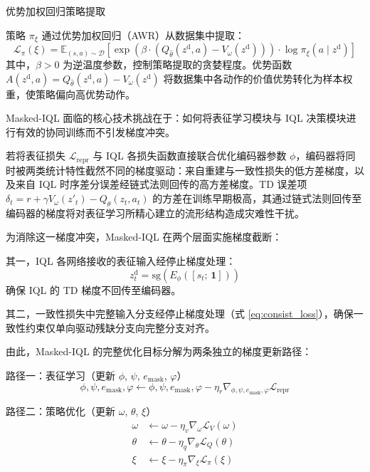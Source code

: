 优势加权回归策略提取

策略 $\pi_\xi$ 通过优势加权回归（AWR）从数据集中提取：
\begin{equation}
    \mathcal{L}_\pi(\xi) = \mathbb{E}_{(s, a) \sim \mathcal{D}}\!\left[\exp\!\left(\beta \cdot (Q_{\hat{\theta}}(z^{\text{d}}, a) - V_\omega(z^{\text{d}}))\right) \cdot \log \pi_\xi(a \mid z^{\text{d}})\right]
    \label{eq:iql_policy}
\end{equation}
其中，$\beta > 0$ 为逆温度参数，控制策略提取的贪婪程度。优势函数 $A(z^{\text{d}},a) = Q_{\hat{\theta}}(z^{\text{d}},a) - V_\omega(z^{\text{d}})$ 将数据集中各动作的价值优势转化为样本权重，使策略偏向高优势动作。

\label{sec:gradient_decouple}

Masked-IQL 面临的核心技术挑战在于：如何将表征学习模块与 IQL 决策模块进行有效的协同训练而不引发梯度冲突。

若将表征损失 $\mathcal{L}_{\text{repr}}$ 与 IQL 各损失函数直接联合优化编码器参数 $\phi$，编码器将同时被两类统计特性截然不同的梯度驱动：来自重建与一致性损失的低方差梯度，以及来自 IQL 时序差分误差经链式法则回传的高方差梯度。TD 误差项 $\delta_t = r + \gamma V_\omega(z'_t) - Q_\theta(z_t, a_t)$ 的方差在训练早期极高，其通过链式法则回传至编码器的梯度将对表征学习所精心建立的流形结构造成灾难性干扰。

为消除这一梯度冲突，Masked-IQL 在两个层面实施梯度截断：

其一，IQL 各网络接收的表征输入经停止梯度处理：
\begin{equation}
    z_t^{\text{d}} = \text{sg}(E_\phi([s_t;\, \mathbf{1}]))
\end{equation}
确保 IQL 的 TD 梯度不回传至编码器。

其二，一致性损失中完整输入分支经停止梯度处理（式 \eqref{eq:consist_loss}），确保一致性约束仅单向驱动残缺分支向完整分支对齐。

由此，Masked-IQL 的完整优化目标分解为两条独立的梯度更新路径：

路径一：表征学习（更新 $\phi$, $\psi$, $e_{\text{mask}}$, $\varphi$）
\begin{equation}
    \phi, \psi, e_{\text{mask}}, \varphi \leftarrow \phi, \psi, e_{\text{mask}}, \varphi - \eta_r \nabla_{\phi, \psi, e_{\text{mask}}, \varphi} \mathcal{L}_{\text{repr}}
\end{equation}

路径二：策略优化（更新 $\omega$, $\theta$, $\xi$）
\begin{equation}
    \begin{aligned}
        \omega &\leftarrow \omega - \eta_v \nabla_\omega \mathcal{L}_V(\omega) \\
        \theta &\leftarrow \theta - \eta_q \nabla_\theta \mathcal{L}_Q(\theta) \\
        \xi &\leftarrow \xi - \eta_\pi \nabla_\xi \mathcal{L}_\pi(\xi)
    \end{aligned}
\end{equation}

